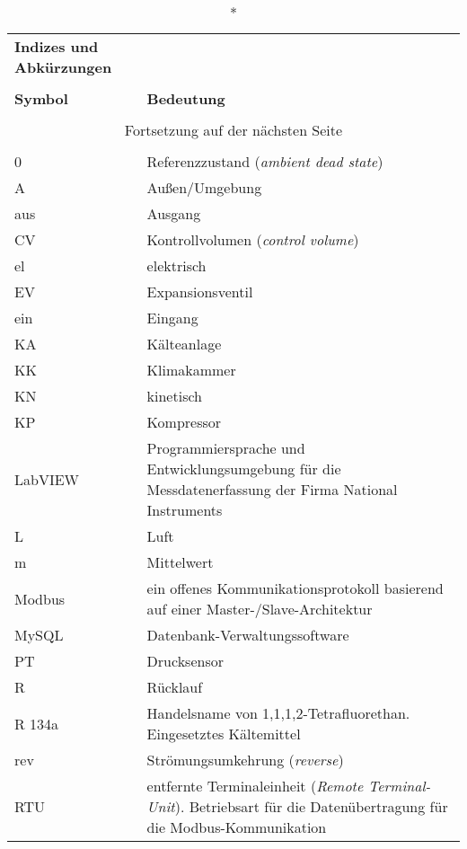 \begin{onehalfspacing}
\begin{longtable}[h]{p{} p{}}
		\caption*{\textbf{Indizes und Abkürzungen}} \\
		\\
		\textbf{Symbol} & \textbf{Bedeutung} \\ %
		\endhead
		\\
		\multicolumn{2}{c}{Fortsetzung auf der nächsten Seite} \\
		\endfoot
		\multicolumn{2}{c}{ } \\
		\endlastfoot
		
		0 & Referenzzustand (\emph{ambient dead state})\\
		A & Außen/Umgebung\\ 	
		aus & Ausgang\\	
		CV & Kontrollvolumen (\emph{control volume})\\
		el & elektrisch \\
		EV & Expansionsventil\\
		ein & Eingang \\
		KA & Kälteanlage \\
		KK & Klimakammer\\
		KN & kinetisch\\
		KP & Kompressor\\
		LabVIEW & Programmiersprache und Entwicklungsumgebung für die Messdatenerfassung der Firma National Instruments\\
		L & Luft\\
		m & Mittelwert\\
		Modbus & ein offenes Kommunikationsprotokoll basierend auf einer Master-/Slave-Architektur \\
		MySQL & Datenbank-Verwaltungssoftware \\
		PT & Drucksensor\\
		R & Rücklauf\\
		R 134a & Handelsname von 1,1,1,2-Tetrafluorethan. Eingesetztes Kältemittel\\ 
		rev & Strömungsumkehrung (\emph{reverse})\\
		RTU & entfernte Terminaleinheit (\emph{Remote Terminal-Unit}). Betriebsart für die Datenübertragung für die Modbus-Kommunikation \\

\end{longtable}
\end{onehalfspacing}
